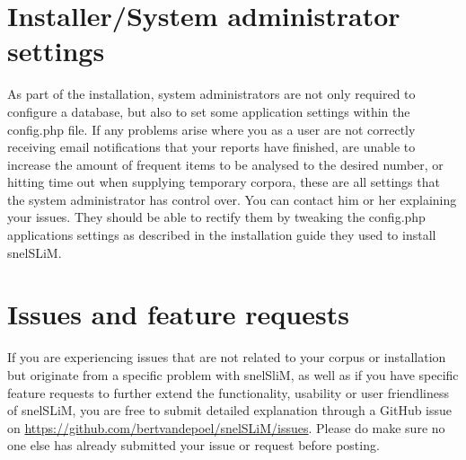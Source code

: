 \documentclass[11pt,a4paper]{article}
\begin{document}
\section{Installer/System administrator settings}

As part of the installation, system administrators are not only required to configure a database, but also to set some application settings within the config.php file. If any problems arise where you as a user are not correctly receiving email notifications that your reports have finished, are unable to increase the amount of frequent items to be analysed to the desired number, or hitting time out when supplying temporary corpora, these are all settings that the system administrator has control over. You can contact him or her explaining your issues. They should be able to rectify them by tweaking the config.php applications settings as described in the installation guide they used to install snelSLiM. 

\section{Issues and feature requests}

If you are experiencing issues that are not related to your corpus or installation but originate from a specific problem with snelSliM, as well as if you have specific feature requests to further extend the functionality, usability or user friendliness of snelSLiM, you are free to submit detailed explanation through a GitHub issue on \url{https://github.com/bertvandepoel/snelSLiM/issues}. Please do make sure no one else has already submitted your issue or request before posting.
\end{document}
